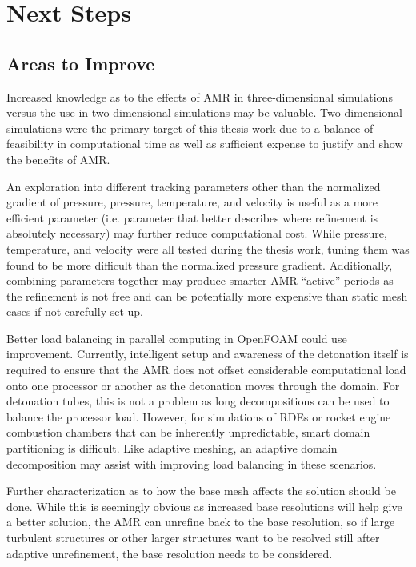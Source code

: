 \section{Next Steps}
\subsection{Areas to Improve}
Increased knowledge as to the effects of AMR in three-dimensional simulations versus the use in two-dimensional simulations may be valuable. Two-dimensional simulations were the primary target of this thesis work due to a balance of feasibility in computational time as well as sufficient expense to justify and show the benefits of AMR. 

An exploration into different tracking parameters other than the normalized gradient of pressure, pressure, temperature, and velocity is useful as a more efficient parameter (i.e. parameter that better describes where refinement is absolutely necessary) may further reduce computational cost. While pressure, temperature, and velocity were all tested during the thesis work, tuning them was found to be more difficult than the normalized pressure gradient. Additionally, combining parameters together may produce smarter AMR ``active'' periods as the refinement is not free and can be potentially more expensive than static mesh cases if not carefully set up. 

Better load balancing in parallel computing in OpenFOAM could use improvement. Currently, intelligent setup and awareness of the detonation itself is required to ensure that the AMR does not offset considerable computational load onto one processor or another as the detonation moves through the domain. For detonation tubes, this is not a problem as long decompositions can be used to balance the processor load. However, for simulations of RDEs or rocket engine combustion chambers that can be inherently unpredictable, smart domain partitioning is difficult. Like adaptive meshing, an adaptive domain decomposition may assist with improving load balancing in these scenarios. 

Further characterization as to how the base mesh affects the solution should be done. While this is seemingly obvious as increased base resolutions will help give a better solution, the AMR can unrefine back to the base resolution, so if large turbulent structures or other larger structures want to be resolved still after adaptive unrefinement, the base resolution needs to be considered. 

